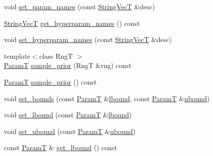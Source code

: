 \begin{DoxyCompactItemize}
\item 
void \hyperlink{classmappel_1_1PointEmitterModel_a2abccbca47fc60700d73244e6c4dbe30}{set\+\_\+param\+\_\+names} (const \hyperlink{namespacemappel_aae88cf18bccfbb789a6019bcfbbfca68}{String\+VecT} \&desc)
\item 
\hyperlink{namespacemappel_aae88cf18bccfbb789a6019bcfbbfca68}{String\+VecT} \hyperlink{classmappel_1_1PointEmitterModel_a1b8bbd4bdddfb8f5236e8e50fe546c36}{get\+\_\+hyperparam\+\_\+names} () const 
\item 
void \hyperlink{classmappel_1_1PointEmitterModel_a6cdba258bda50cff162dc16a49383bb0}{set\+\_\+hyperparam\+\_\+names} (const \hyperlink{namespacemappel_aae88cf18bccfbb789a6019bcfbbfca68}{String\+VecT} \&desc)
\item 
{\footnotesize template$<$class RngT $>$ }\\\hyperlink{classmappel_1_1PointEmitterModel_a665ec6aea3aac139bb69a23c06d4b9a1}{ParamT} \hyperlink{classmappel_1_1PointEmitterModel_ae69bf3df2c94b351015bbf81e52dfe03}{sample\+\_\+prior} (RngT \&rng) const 
\item 
\hyperlink{classmappel_1_1PointEmitterModel_a665ec6aea3aac139bb69a23c06d4b9a1}{ParamT} \hyperlink{classmappel_1_1PointEmitterModel_abd9d2923ca9a838897a9b26bfb3ce073}{sample\+\_\+prior} () const 
\item 
void \hyperlink{classmappel_1_1PointEmitterModel_a31f139d9eb58f210f3359a9f5be9dd15}{set\+\_\+bounds} (const \hyperlink{classmappel_1_1PointEmitterModel_a665ec6aea3aac139bb69a23c06d4b9a1}{ParamT} \&\hyperlink{classmappel_1_1PointEmitterModel_a889bc82f74cfa654da121e5770296ab2}{lbound}, const \hyperlink{classmappel_1_1PointEmitterModel_a665ec6aea3aac139bb69a23c06d4b9a1}{ParamT} \&\hyperlink{classmappel_1_1PointEmitterModel_a35b883e84b6a2e0093bdf482c623beef}{ubound})
\item 
void \hyperlink{classmappel_1_1PointEmitterModel_a737fa5857415b9830fa2e5ccdff48541}{set\+\_\+lbound} (const \hyperlink{classmappel_1_1PointEmitterModel_a665ec6aea3aac139bb69a23c06d4b9a1}{ParamT} \&\hyperlink{classmappel_1_1PointEmitterModel_a889bc82f74cfa654da121e5770296ab2}{lbound})
\item 
void \hyperlink{classmappel_1_1PointEmitterModel_a7363961cc405e585b39e81a7ad85c8d6}{set\+\_\+ubound} (const \hyperlink{classmappel_1_1PointEmitterModel_a665ec6aea3aac139bb69a23c06d4b9a1}{ParamT} \&\hyperlink{classmappel_1_1PointEmitterModel_a35b883e84b6a2e0093bdf482c623beef}{ubound})
\item 
const \hyperlink{classmappel_1_1PointEmitterModel_a665ec6aea3aac139bb69a23c06d4b9a1}{ParamT} \& \hyperlink{classmappel_1_1PointEmitterModel_aeb486e8f6f6fa694e3746e84eebcf848}{get\+\_\+lbound} () const 

\end{DoxyCompactItemize}
